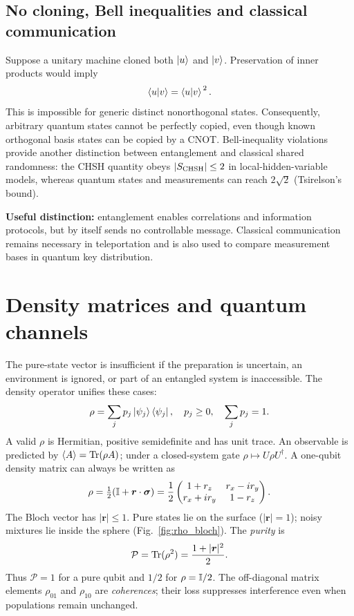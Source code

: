 \subsection{No cloning, Bell inequalities and classical communication}
Suppose a unitary machine cloned both $\left\lvert u\right\rangle$ and $\left\lvert v\right\rangle$. Preservation of inner products would imply
\begin{equation}
\left\langle u\middle\vert v\right\rangle=\left\langle u\middle\vert v\right\rangle^{\,2}.
\end{equation}
This is impossible for generic distinct nonorthogonal states. Consequently, arbitrary quantum states cannot be perfectly copied, even though known orthogonal basis states can be copied by a CNOT. Bell-inequality violations provide another distinction between entanglement and classical shared randomness: the CHSH quantity obeys $|S_{\rm CHSH}|\leq2$ in local-hidden-variable models, whereas quantum states and measurements can reach $2\sqrt2$ (Tsirelson's bound).

\textbf{Useful distinction:} entanglement enables correlations and information protocols, but by itself sends no controllable message. Classical communication remains necessary in teleportation and is also used to compare measurement bases in quantum key distribution.

\section{Density matrices and quantum channels}\label{sec:channels}
The pure-state vector is insufficient if the preparation is uncertain, an environment is ignored, or part of an entangled system is inaccessible. The density operator unifies these cases:
\begin{equation}\label{eq:density}
\rho=\sum_j p_j\left\lvert \psi_j\right\rangle\left\langle \psi_j\right\rvert,\quad p_j\geq0,\quad\sum_jp_j=1.
\end{equation}
A valid $\rho$ is Hermitian, positive semidefinite and has unit trace. An observable is predicted by $\langle A\rangle=\operatorname{Tr}(\rho A)$; under a closed-system gate $\rho\mapsto U\rho U^\dagger$. A one-qubit density matrix can always be written as
\begin{equation}\label{eq:blochrho}
\rho=\tfrac12(\mathbb{I}+\bm r\cdot\bm\sigma)
=\frac12\begin{pmatrix}1+r_z&r_x-ir_y\\r_x+ir_y&1-r_z\end{pmatrix}.
\end{equation}
The Bloch vector has $|\bm r|\leq1$. Pure states lie on the surface ($|\bm r|=1$); noisy mixtures lie inside the sphere (Fig.~\ref{fig:rho_bloch}). The \emph{purity} is
\begin{equation}\label{eq:purity}
\mathcal P=\operatorname{Tr}(\rho^2)=\frac{1+|\bm r|^2}{2}.
\end{equation}
Thus $\mathcal P=1$ for a pure qubit and $1/2$ for $\rho=\mathbb{I}/2$. The off-diagonal matrix elements $\rho_{01}$ and $\rho_{10}$ are \emph{coherences}; their loss suppresses interference even when populations remain unchanged.

